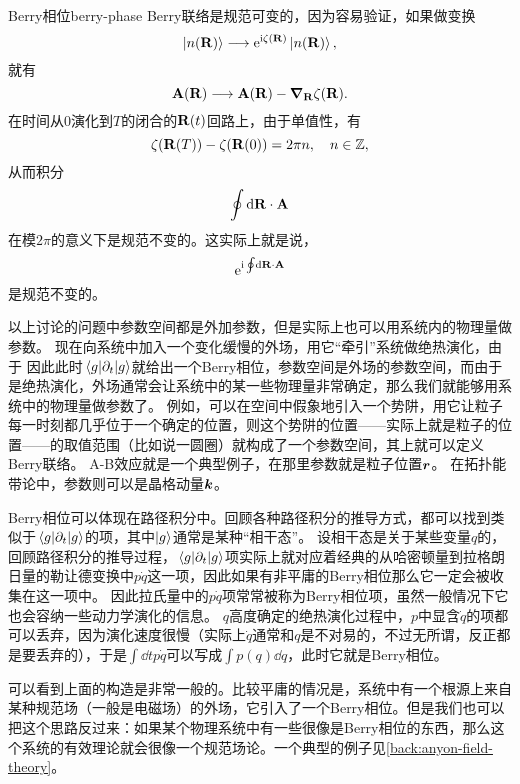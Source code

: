 \begin{back}{Berry相位}{berry-phase}
    Berry联络是规范可变的，因为容易验证，如果做变换
    \begin{equation}
        \ket{n(\vb{R})} \longrightarrow \mathrm{e}^{\mathrm{i} \zeta(\vb{R})} \ket{n(\vb{R})}, 
    \end{equation}
    就有
    \begin{equation}
        \vb{A}(\vb{R}) \longrightarrow \vb{A}(\vb{R}) - \grad_{\vb{R}} \zeta(\vb{R}).
    \end{equation}
    在时间从$0$演化到$T$的闭合的$\vb{R}(t)$回路上，由于单值性，有
    \[
        \zeta(\vb{R}(T)) - \zeta(\vb{R}(0)) = 2 \pi n, \quad n \in \mathbb{Z},
    \]
    从而积分
    \begin{equation}
        \oint \dd{\vb{R}} \cdot \vb{A}
    \end{equation}
    在模$2\pi$的意义下是规范不变的。这实际上就是说，
    \begin{equation}
        \mathrm{e}^{\mathrm{i} \oint \dd{\vb{R}} \cdot \vb{A}}
    \end{equation}
    是规范不变的。

    以上讨论的问题中参数空间都是外加参数，但是实际上也可以用系统内的物理量做参数。
    现在向系统中加入一个变化缓慢的外场，用它“牵引”系统做绝热演化，由于
    因此此时$\mel{g}{\partial_t}{g}$就给出一个Berry相位，参数空间是外场的参数空间，而由于是绝热演化，外场通常会让系统中的某一些物理量非常确定，那么我们就能够用系统中的物理量做参数了。
    例如，可以在空间中假象地引入一个势阱，用它让粒子每一时刻都几乎位于一个确定的位置，则这个势阱的位置——实际上就是粒子的位置——的取值范围（比如说一圆圈）就构成了一个参数空间，其上就可以定义Berry联络。
    A-B效应就是一个典型例子，在那里参数就是粒子位置$\vb*{r}$。
    在拓扑能带论中，参数则可以是晶格动量$\vb*{k}$。

    Berry相位可以体现在路径积分中。回顾各种路径积分的推导方式，都可以找到类似于$\mel{g}{\partial_t}{g}$的项，其中$\ket{g}$通常是某种“相干态”。
    设相干态是关于某些变量$q$的，回顾路径积分的推导过程，$\mel{g}{\partial_t}{g}$项实际上就对应着经典的从哈密顿量到拉格朗日量的勒让德变换中$p \dot{q}$这一项，因此如果有非平庸的Berry相位那么它一定会被收集在这一项中。
    因此拉氏量中的$p \dot{q}$项常常被称为Berry相位项，虽然一般情况下它也会容纳一些动力学演化的信息。
    $q$高度确定的绝热演化过程中，$p$中显含$\dot{q}$的项都可以丢弃，因为演化速度很慢（实际上$\dot{q}$通常和$q$是不对易的，不过无所谓，反正都是要丢弃的），于是$\int \dd{t} p \dot{q}$可以写成$\int p(q) \dd{q}$，此时它就是Berry相位。

    可以看到上面的构造是非常一般的。比较平庸的情况是，系统中有一个根源上来自某种规范场（一般是电磁场）的外场，它引入了一个Berry相位。但是我们也可以把这个思路反过来：如果某个物理系统中有一些很像是Berry相位的东西，那么这个系统的有效理论就会很像一个规范场论。一个典型的例子见\autoref{back:anyon-field-theory}。
\end{back}

